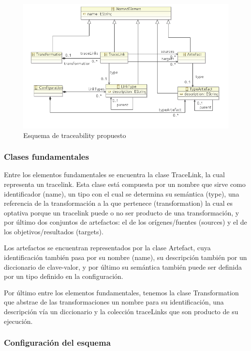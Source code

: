\documentclass[a4paper,12pt,oneside,spanish]{book}
\begin{document}
\begin{figure}[hbtp]
\centering
\includegraphics[scale=0.76]{./img/Esquema}
\caption{Esquema de traceability propuesto}
\label{fig:EsquenaPropuesto}
\end{figure}


\subsubsection{Clases fundamentales}

Entre los elementos fundamentales se encuentra la clase \textsf{TraceLink}, la cual representa un tracelink. Esta clase está compuesta por un nombre que sirve como identificador (\textsf{name}), un tipo con el cual se determina su semántica (\textsf{type}), una referencia de la transformación a la que pertenece (\textsf{transformation}) la cual es optativa porque un tracelink puede o no ser producto de una transformación, y por último dos conjuntos de artefactos: el de los orígenes/fuentes (\textsf{sources}) y el de los objetivos/resultados (\textsf{targets}).

Los artefactos se encuentran representados por la clase \textsf{Artefact}, cuya identificación también pasa por su nombre (\textsf{name}), su descripción también por un diccionario de clave-valor, y por último su semántica también puede ser definida por un tipo definido en la configuración.

Por último entre los elementos fundamentales, tenemos la clase \textsf{Transformation} que abstrae de las transformaciones un nombre para su identificación, una descripción vía un diccionario y la colección \textsf{traceLinks} que son producto de su ejecución.


\subsubsection{Configuración del esquema}
\end{document}
